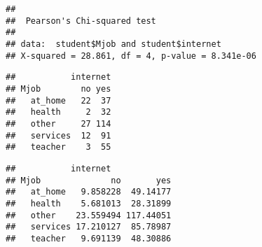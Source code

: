 \documentclass[
]{book}
\newenvironment{Shaded}{\begin{snugshade}}{\end{snugshade}}
\newcommand{\AttributeTok}[1]{\textcolor[rgb]{0.13,0.29,0.53}{#1}}
\newcommand{\ConstantTok}[1]{\textcolor[rgb]{0.56,0.35,0.01}{#1}}
\newcommand{\FunctionTok}[1]{\textcolor[rgb]{0.13,0.29,0.53}{\textbf{#1}}}
\newcommand{\NormalTok}[1]{#1}
\newcommand{\OtherTok}[1]{\textcolor[rgb]{0.56,0.35,0.01}{#1}}
\newcommand{\SpecialCharTok}[1]{\textcolor[rgb]{0.81,0.36,0.00}{\textbf{#1}}}
\theoremstyle{definition}
\theoremstyle{definition}
\theoremstyle{definition}
\theoremstyle{definition}
\theoremstyle{remark}
\begin{document}
\begin{Shaded}
\end{Shaded}

\begin{verbatim}
## 
##  Pearson's Chi-squared test
## 
## data:  student$Mjob and student$internet
## X-squared = 28.861, df = 4, p-value = 8.341e-06
\end{verbatim}

\begin{Shaded}
\end{Shaded}

\begin{verbatim}
##           internet
## Mjob        no yes
##   at_home   22  37
##   health     2  32
##   other     27 114
##   services  12  91
##   teacher    3  55
\end{verbatim}

\begin{Shaded}
\end{Shaded}

\begin{verbatim}
##           internet
## Mjob              no       yes
##   at_home   9.858228  49.14177
##   health    5.681013  28.31899
##   other    23.559494 117.44051
##   services 17.210127  85.78987
##   teacher   9.691139  48.30886
\end{verbatim}
\end{document}
